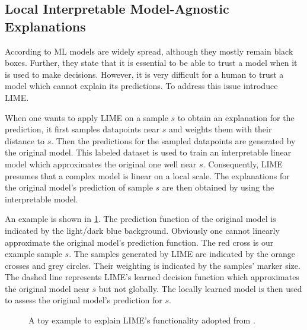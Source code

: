\subsection{Local Interpretable Model-Agnostic Explanations}
\label{chp:fundamentals:sec:machine_learning:subsec:LIME}
According to \textcite{Ribeiro:2016} \ac{ML} models are widely spread, although they mostly remain black boxes.
Further, they state that it is essential to be able to trust a model when it is used to make decisions.
However, it is very difficult for a human to trust a model which cannot explain its predictions.
To address this issue \textcite{Ribeiro:2016} introduce \ac{LIME}.

When one wants to apply \ac{LIME} on a sample $s$ to obtain an explanation for the prediction, it first samples datapoints near $s$ and weights them with their distance to $s$.
Then the predictions for the sampled datapoints are generated by the original model.
This labeled dataset is used to train an interpretable linear model which approximates the original one well near $s$.
Consequently, \ac{LIME} presumes that a complex model is linear on a local scale.
The explanations for the original model's prediction of sample $s$ are then obtained by using the interpretable model. \parencite{Ribeiro:2016}

An example is shown in \cref{fig:fundamentals:LIME}.
The prediction function of the original model is indicated by the light/dark blue background.
Obviously one cannot linearly approximate the original model's prediction function.
The red cross is our example sample $s$.
The samples generated by \ac{LIME} are indicated by the orange crosses and grey circles.
Their weighting is indicated by the samples' marker size.
The dashed line represents \ac{LIME}'s learned decision function which approximates the original model near $s$ but not globally.
The locally learned model is then used to assess the original model's prediction for $s$.
\begin{figure}[htpb]
    \centering
    
    \caption[LIME Example Data]{A toy example to explain \ac{LIME}'s functionality adopted from \textcite{Ribeiro:2016}.}\label{fig:fundamentals:LIME}
\end{figure}
